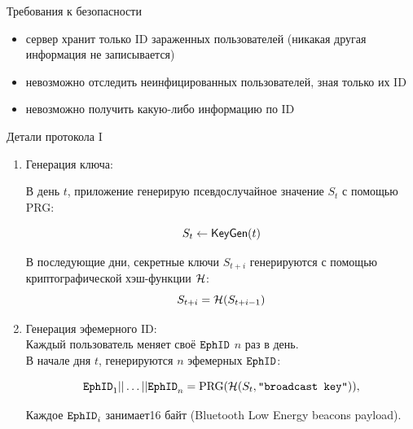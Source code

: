 \documentclass[usenames,dvipsnames,8pt,aspectratio=169]{beamer}
\begin{document}
\begin{frame}{Требования к безопасности}
	\Large 
	
	\begin{itemize}
		\item сервер  хранит только ID зараженных пользователей (никакая другая информация не записывается)
		\item невозможно отследить неинфицированных пользователей, зная только их ID
		\item невозможно получить какую-либо информацию по ID
	\end{itemize}
\end{frame}



\begin{frame}{Детали протокола I}
\large
\begin{enumerate}
	\itemsep 1em
	\item  {\color{Orange}Генерация ключа:}
	
	В день $t$, приложение генерирую псевдослучайное значение $S_t $ с помощью PRG:
	
	\[S_t \leftarrow \textsf{KeyGen}(t)\]

	 
	 В последующие дни, секретные ключи $S_{t+i}$ генерируются с помощью {\color{Orange} криптографической хэш-функции} $\mathcal{H}$:
	 \[
	 	S_{t+i} = \mathcal{H}(S_{t+i-1})
	 \]
	  \vspace{5pt}
	  
	 \item {\color{Orange} Генерация эфемерного ID:}  \\
	 Каждый пользователь меняет своё $\mathtt{EphID}$ $n$ раз в день. \\
	 В начале дня $t$, генерируются $n$ эфемерных $\mathtt{EphID}$:
	 
	 \[
	 	\mathtt{EphID}_1 || \ldots || \mathtt{EphID}_n = \text{PRG} (  \mathcal{H} (S_t, \texttt{``broadcast key''}) ),
	 \]
	 
	  \vspace{5pt}
	 Каждое $\mathtt{EphID}_i$ занимает16 байт (Bluetooth Low Energy beacons payload).
	 
\end{enumerate}
\end{frame}
\end{document}
